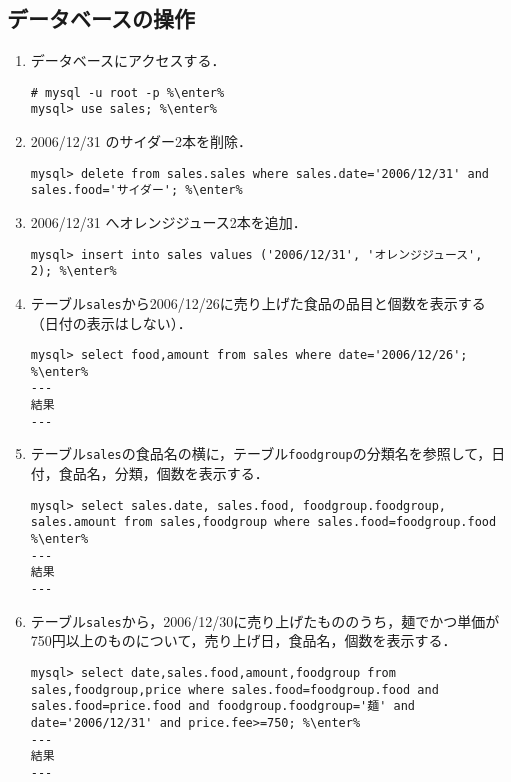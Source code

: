 \documentclass{jlreq}
\begin{document}
\subsection{データベースの操作}
\begin{enumerate}
    \item データベースにアクセスする．
          \begin{lstlisting}
# mysql -u root -p %\enter%
mysql> use sales; %\enter%
    \end{lstlisting}
    \item 2006/12/31 のサイダー2本を削除．
          \begin{lstlisting}
mysql> delete from sales.sales where sales.date='2006/12/31' and sales.food='サイダー'; %\enter%
\end{lstlisting}
    \item 2006/12/31 へオレンジジュース2本を追加．
          \begin{lstlisting}
mysql> insert into sales values ('2006/12/31', 'オレンジジュース', 2); %\enter%
\end{lstlisting}
    \item テーブル\texttt{sales}から2006/12/26に売り上げた食品の品目と個数を表示する（日付の表示はしない）．
          \begin{lstlisting}
mysql> select food,amount from sales where date='2006/12/26'; %\enter%
---
結果
---
\end{lstlisting}
    \item テーブル\texttt{sales}の食品名の横に，テーブル\texttt{foodgroup}の分類名を参照して，日付，食品名，分類，個数を表示する．
          \begin{lstlisting}
mysql> select sales.date, sales.food, foodgroup.foodgroup, sales.amount from sales,foodgroup where sales.food=foodgroup.food %\enter%
---
結果
---
\end{lstlisting}
    \item テーブル\texttt{sales}から，2006/12/30に売り上げたもののうち，麺でかつ単価が750円以上のものについて，売り上げ日，食品名，個数を表示する．
          \begin{lstlisting}
mysql> select date,sales.food,amount,foodgroup from sales,foodgroup,price where sales.food=foodgroup.food and sales.food=price.food and foodgroup.foodgroup='麺' and date='2006/12/31' and price.fee>=750; %\enter%
---
結果
---
\end{lstlisting}
\end{enumerate}
\end{document}
